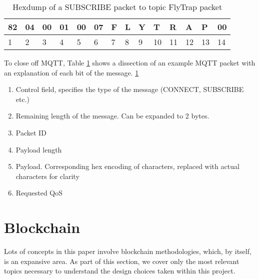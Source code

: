\begin{table}[h]
\centering
\begin{tabular}{llllllllllllll}
\hline
\multicolumn{1}{|l|}{82} & \multicolumn{1}{l|}{04} & \multicolumn{1}{l|}{00} & \multicolumn{1}{l|}{01} & \multicolumn{1}{l|}{00} & \multicolumn{1}{l|}{07} & \multicolumn{1}{l|}{F} & \multicolumn{1}{l|}{L} & \multicolumn{1}{l|}{Y} & \multicolumn{1}{l|}{T} & \multicolumn{1}{l|}{R} & \multicolumn{1}{l|}{A} & \multicolumn{1}{l|}{P} & \multicolumn{1}{l|}{00} \\ \hline
1                        & 2                       & 3                       & 4                       & 5                       & 6                       & 7                      & 8                      & 9                      & 10                     & 11                     & 12                     & 13                     & 14                     
\end{tabular}
\caption{Hexdump of a SUBSCRIBE packet to topic FlyTrap packet}
\label{tab:sub_packet}
\end{table}

To close off MQTT, Table \ref{tab:sub_packet} shows a dissection of an example MQTT packet with an explanation of each bit of the message. \ref{tab:sub_packet}
\begin{enumerate}
  \item [1] Control field, specifies the type of the message (CONNECT, SUBSCRIBE etc.)
  \item [2] Remaining length of the message. Can be expanded to 2 bytes.
  \item [3-4] Packet ID
  \item [5-6] Payload length
  \item [7-13] Payload. Corresponding hex encoding of characters, replaced with actual characters for clarity
  \item [14] Requested QoS
\end{enumerate}

\section{Blockchain}

Lots of concepts in this paper involve blockchain methodologies, which, by itself, is an expansive area. As part of this section, we cover only the most relevant topics necessary to understand the design choices taken within this project.

